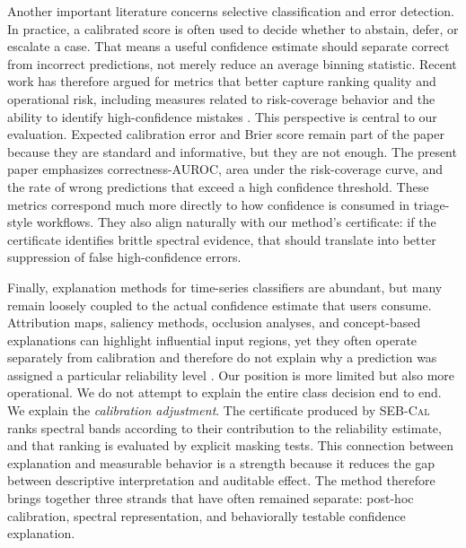 \documentclass{article}
\newcommand{\method}{\textsc{SEB-Cal}}
\begin{document}
Another important literature concerns selective classification and error detection. In practice, a calibrated score is often used to decide whether to abstain, defer, or escalate a case. That means a useful confidence estimate should separate correct from incorrect predictions, not merely reduce an average binning statistic. Recent work has therefore argued for metrics that better capture ranking quality and operational risk, including measures related to risk-coverage behavior and the ability to identify high-confidence mistakes \cite{elyaniv2010selective,geifman2017selective,traub2024augrc,zhu2023openmix}. This perspective is central to our evaluation. Expected calibration error and Brier score remain part of the paper because they are standard and informative, but they are not enough. The present paper emphasizes correctness-AUROC, area under the risk-coverage curve, and the rate of wrong predictions that exceed a high confidence threshold. These metrics correspond much more directly to how confidence is consumed in triage-style workflows. They also align naturally with our method’s certificate: if the certificate identifies brittle spectral evidence, that should translate into better suppression of false high-confidence errors.

Finally, explanation methods for time-series classifiers are abundant, but many remain loosely coupled to the actual confidence estimate that users consume. Attribution maps, saliency methods, occlusion analyses, and concept-based explanations can highlight influential input regions, yet they often operate separately from calibration and therefore do not explain why a prediction was assigned a particular reliability level \cite{fawaz2019review,rudin2019stop,carvalho2019machine}. Our position is more limited but also more operational. We do not attempt to explain the entire class decision end to end. We explain the \emph{calibration adjustment}. The certificate produced by \method{} ranks spectral bands according to their contribution to the reliability estimate, and that ranking is evaluated by explicit masking tests. This connection between explanation and measurable behavior is a strength because it reduces the gap between descriptive interpretation and auditable effect. The method therefore brings together three strands that have often remained separate: post-hoc calibration, spectral representation, and behaviorally testable confidence explanation.
\end{document}
